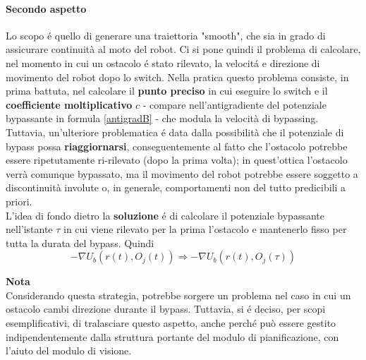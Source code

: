 \documentclass[14pt,a4paper]{extarticle}
\begin{document}

\paragraph{Secondo aspetto}
Lo scopo é quello di generare una traiettoria "smooth", che sia in grado di assicurare continuità al moto del robot. Ci si pone quindi il problema di calcolare, nel momento in cui un ostacolo é stato rilevato, la velocitá e direzione di movimento del robot dopo lo switch. Nella pratica questo problema consiste, in prima battuta, nel calcolare il \textbf{punto preciso} in cui eseguire lo switch e il \textbf{coefficiente moltiplicativo} \(c\) - compare nell'antigradiente del potenziale bypassante in formula \ref{antigradB} - che modula la velocità di bypassing. Tuttavia, un'ulteriore problematica é data dalla possibilità che il potenziale di bypass possa \textbf{riaggiornarsi}, conseguentemente al fatto che l'ostacolo potrebbe essere ripetutamente ri-rilevato (dopo la prima volta); in quest'ottica l'ostacolo verrà comunque bypassato, ma il movimento del robot potrebbe essere soggetto a discontinuità involute o, in generale, comportamenti non del tutto predicibili a priori. \\
L'idea di fondo dietro la \textbf{soluzione} é di calcolare il potenziale bypassante nell'istante \(\tau\) in cui viene rilevato per la prima l'ostacolo e mantenerlo fisso per tutta la durata del bypass. Quindi \[-\nabla U_b \left( r(t) , O_j(t) \right) \Rightarrow -\nabla U_b \left( r(t) , O_j(\tau) \right) \]

\begin{nota}
\textbf{Nota} \\ Considerando questa strategia, potrebbe sorgere un problema nel caso in cui un ostacolo cambi direzione durante il bypass. Tuttavia, si é deciso, per scopi esemplificativi, di tralasciare questo aspetto, anche perché può essere gestito indipendentemente dalla struttura portante del modulo di pianificazione, con l'aiuto del modulo di visione.
\end{nota}

\end{document}
